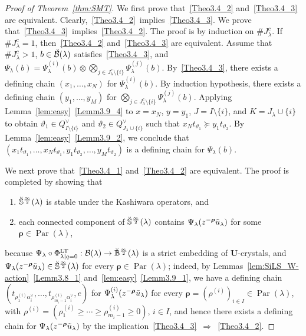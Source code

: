 \documentclass[ALCO,ThmDefs,Unicode,epreuves]{cedram}
\newcommand\bmrho[1]{\boldsymbol{#1}}
\renewcommand{\U}{\mathbf{U}}
\newcommand{\si}{\frac{\infty}{2}}
\DeclareMathOperator{\LT}{LT}
\DeclareMathOperator{\Par}{Par}
\begin{document}
\begin{proof}[Proof of Theorem~\ref{thm:SMT}]
We first prove that~\ref{Theo3.4_2} and~\ref{Theo3.4_3} are equivalent. 
Clearly,~\ref{Theo3.4_2}~implies~\ref{Theo3.4_3}. 
We prove that~\ref{Theo3.4_3}~implies~\ref{Theo3.4_2}. 
The proof is by induction on 
$\# J_{\lambda}^c$. 
If 
$\# J_{\lambda}^c = 1$, 
then~\ref{Theo3.4_2} and~\ref{Theo3.4_3} are equivalent. 
Assume that 
$\# J_{\lambda}^c > 1$, 
$b \in \Breve{\mathcal{B}}(\lambda)$
satisfies~\ref{Theo3.4_3}, and 
$\Psi_{\lambda}(b) = \Psi^{(i)}_{\lambda}(b) \otimes \bigotimes_{j \in J_{\lambda}^c \setminus \{ i \}} \Psi^{(j)}_{\lambda}(b)$.
By~\ref{Theo3.4_3}, there exists a defining chain 
$(x_1 , \ldots , x_N)$
for 
$\Psi_{\lambda}^{(i)}(b)$. 
By induction hypothesis, 
there exists a defining chain 
$(y_1 , \ldots , y_M)$
for 
$\bigotimes_{j \in J_{\lambda}^c \setminus \{ i \}} \Psi_{\lambda}^{(j)}(b)$. 
Applying Lemma~\ref{lem:easy}~\ref{Lemm3.9_4} to
$x = x_N$, $y = y_1$, $J = I \setminus \{ i \}$, and $K = J_{\lambda} \cup \{ i \}$
to obtain 
$\vartheta_1 \in Q_{I \setminus \{ i \}}^{\vee}$
and 
$\vartheta_2 \in Q_{J_{\lambda} \cup \{ i \}}^{\vee}$
such that 
$x_N t_{\vartheta_1} \succeq y_1 t_{\vartheta_2}$. 
By Lemma~\ref{lem:easy}~\ref{Lemm3.9_2}, 
we conclude that 
$(x_1 t_{\vartheta_1} , \ldots , x_N t_{\vartheta_1} , y_1 t_{\vartheta_2} , \ldots , y_M t_{\vartheta_2})$
is a defining chain for 
$\Psi_{\lambda}(b)$.

We next prove that~\ref{Theo3.4_1} and~\ref{Theo3.4_2} are equivalent. 
The proof is completed by showing that 
\begin{enumerate}[label=(\roman*)]
\item\label{proof_theo3.4_i}
$\Breve{\mathbb{S}}^{\si}(\lambda)$ 
is stable under the Kashiwara operators, and 
\item\label{proof_theo3.4_ii}
each connected component of 
$\Breve{\mathbb{S}}^{\si}(\lambda)$ 
contains 
$\Psi_{\lambda}(z^{-\bmrho{\rho}} \Tilde{u}_{\lambda})$
for some 
$\bmrho{\rho} \in \Par (\lambda)$, 
\end{enumerate}
because 
$\Psi_{\lambda} \circ \Phi_{\lambda \mid q=0}^{\LT } : \mathcal{B}(\lambda) \rightarrow \Breve{\mathbb{B}}^{\si}(\lambda)$ 
is a strict embedding of $\U$-crystals, and 
$\Psi_{\lambda}(z^{-\bmrho{\rho}} \Tilde{u}_{\lambda}) \in \Breve{\mathbb{S}}^{\si}(\lambda)$
for every 
$\bmrho{\rho} \in \Par (\lambda)$; 
indeed, 
by Lemmas~\ref{lem:SiLS_W-action}~\ref{Lemm3.8_1} and~\ref{lem:easy}~\ref{Lemm3.9_1}, 
we have a defining chain
$\left( t_{\rho^{(i)}_1 \alpha_i^{\vee}} , \ldots , t_{\rho^{(i)}_{m_i-1} \alpha_i^{\vee}} , e \right)$ 
for
$\Psi_{\lambda}^{(i)}(z^{-\bmrho{\rho}} \Tilde{u}_{\lambda})$
for every 
$\bmrho{\rho} = (\rho^{(i)})_{i \in I} \in \Par (\lambda)$, 
with 
$\rho^{(i)} = (\rho^{(i)}_1 \geq \cdots \geq \rho^{(i)}_{m_i-1} \geq 0)$, 
$i \in I$, 
and hence there exists a defining chain for 
$\Psi_{\lambda}(z^{-\bmrho{\rho}} \Tilde{u}_{\lambda})$
by the implication~\ref{Theo3.4_3}~$\Rightarrow$~\ref{Theo3.4_2}.


\end{proof}
\end{document}
